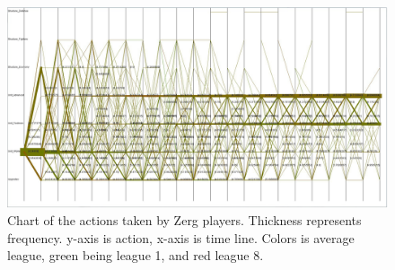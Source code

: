 \documentclass[a4paper,11pt]{article}
\begin{document}
\begin{figure}[H]
\centering
  \includegraphics[width=.9\linewidth]{sequence_league}
\caption{Chart of the actions taken by Zerg players. Thickness represents frequency. y-axis is action, x-axis is time line. Colors is average league, green being league 1, and red league 8.}
\label{fig:sequence_league}
\end{figure}
\end{document}

